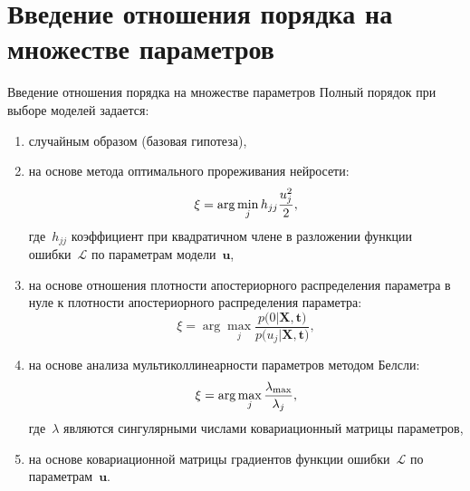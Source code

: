 \documentclass[10pt,pdf,hyperref={unicode}]{beamer}
\begin{document}
\section{Введение отношения порядка на множестве параметров}
\justifying
\begin{frame}{Введение отношения порядка на множестве параметров}
Полный порядок при выборе моделей задается:
\begin{enumerate}[1)]
	\item случайным образом (базовая гипотеза),
	\item на основе метода оптимального прореживания нейросети:
	\[
	\xi = \arg \min_{j} h_{jj}\frac{u_j^2}{2},
	\setlength\belowdisplayskip{0pt}
	\]
	где~$h_{jj}$ коэффициент при квадратичном члене в разложении функции ошибки~$\mathcal{L}$ по параметрам модели~$\mathbf{u}$,
	\item на основе отношения плотности апостериорного распределения параметра в нуле к плотности апостериорного распределения параметра:
	\[
	\xi = \arg \max_{j} \frac{p\bigr(0|\mathbf{X}, \mathbf{t}\bigr)}{p\bigr(u_j|\mathbf{X}, \mathbf{t}\bigr)},
	\]
	\item на основе анализа мультиколлинеарности параметров методом Белсли:
	\[
	\xi = \arg \max_{j} \frac{\lambda_{\max}}{\lambda_{j}}, 
	\setlength\belowdisplayskip{0pt}
	\]
	где~$\lambda$ являются сингулярными числами ковариационный матрицы параметров,
	\item на основе ковариационной матрицы градиентов функции ошибки~$\mathcal{L}$ по параметрам~$\mathbf{u}$.
	
\end{enumerate}
\end{frame}

\end{document}
